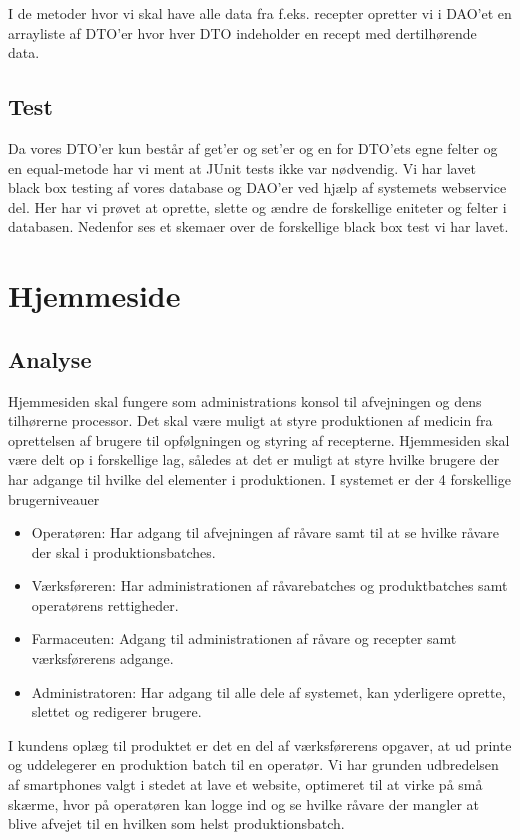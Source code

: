 \documentclass[a4paper]{article}
\begin{document}
I de metoder hvor vi skal have alle data fra f.eks. recepter opretter vi i DAO’et en arrayliste af DTO’er hvor hver DTO indeholder en recept med dertilhørende data.



\subsection{Test} %

Da vores DTO’er kun består af get’er og set’er og en for DTO’ets egne felter og en equal-metode har vi ment at JUnit tests ikke var nødvendig. Vi har lavet black box testing af vores database og DAO’er ved hjælp af systemets webservice del. Her har vi prøvet at oprette, slette og ændre de forskellige eniteter og felter i databasen. Nedenfor ses et skemaer over de forskellige black box test vi har lavet.


\clearpage



\section{Hjemmeside} %

\subsection{Analyse} %

Hjemmesiden skal fungere som administrations konsol til afvejningen og dens tilhørerne processor.  Det skal være muligt at styre produktionen af medicin fra oprettelsen af brugere til opfølgningen og styring af recepterne.  Hjemmesiden skal være delt op i forskellige lag, således at det er muligt at styre hvilke brugere der har adgange til hvilke del elementer i produktionen. I systemet er der 4 forskellige brugerniveauer
\begin{itemize}
  \item Operatøren: Har adgang til afvejningen af råvare samt til at se hvilke råvare der skal i produktionsbatches.
  \item Værksføreren: Har administrationen af råvarebatches og produktbatches samt operatørens rettigheder.
  \item Farmaceuten: Adgang til administrationen af råvare og recepter samt værksførerens adgange. 
  \item Administratoren: Har adgang til alle dele af systemet, kan yderligere oprette, slettet og redigerer brugere.
\end{itemize}
I kundens oplæg til produktet er det en del af værksførerens opgaver, at ud printe og uddelegerer en produktion batch til en operatør. Vi har grunden udbredelsen af smartphones valgt i stedet at lave et website, optimeret til at virke på små skærme, hvor på operatøren kan logge ind og se hvilke råvare der mangler at blive afvejet til en hvilken som helst produktionsbatch. 
\end{document}
